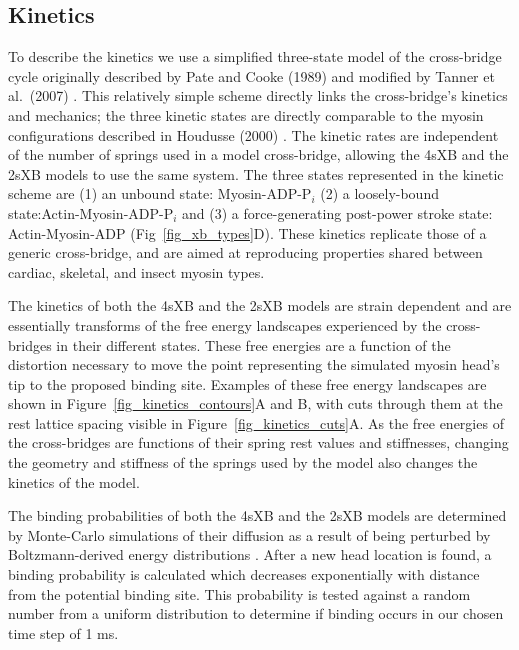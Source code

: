 \documentclass[10pt]{article}
\newcommand{\citep}[1]{\cite{#1}} %
\begin{document}
\subsection*{Kinetics} %

To describe the kinetics we use a simplified three-state model of the cross-bridge cycle originally described by Pate and Cooke (1989) \citep{Pate1989} and modified by Tanner et al.~(2007) \citep{Tanner2007}. 
This relatively simple scheme directly links the cross-bridge's kinetics and mechanics; the three kinetic states are directly comparable to the myosin configurations described in Houdusse (2000) \citep{Houdusse2000}. 
The kinetic rates are independent of the number of springs used in a model cross-bridge, allowing the 4sXB and the 2sXB models to use the same system. 
The three states represented in the kinetic scheme are (1) an unbound state: Myosin-ADP-P$_i$ (2) a loosely-bound state:Actin-Myosin-ADP-P$_i$ and (3) a force-generating post-power stroke state: Actin-Myosin-ADP (Fig~\ref{fig_xb_types}D). 
These kinetics replicate those of a generic cross-bridge, and are aimed at reproducing properties shared between cardiac, skeletal, and insect myosin types. 

The kinetics of both the 4sXB and the 2sXB models are strain dependent and are essentially transforms of the free energy landscapes experienced by the cross-bridges in their different states.
These free energies are a function of the distortion necessary to move the point representing the simulated myosin head's tip to the proposed binding site. 
Examples of these free energy landscapes are shown in Figure~\ref{fig_kinetics_contours}A and B, with cuts through them at the rest lattice spacing visible in Figure~\ref{fig_kinetics_cuts}A.
As the free energies of the cross-bridges are functions of their spring rest values and stiffnesses, changing the geometry and stiffness of the springs used by the model also changes the kinetics of the model. 

The binding probabilities of both the 4sXB and the 2sXB models are determined by Monte-Carlo simulations of their diffusion as a result of being perturbed by Boltzmann-derived energy distributions \citep{DillBook}. 
After a new head location is found, a binding probability is calculated which decreases exponentially with distance from the potential binding site. 
This probability is tested against a random number from a uniform distribution to determine if binding occurs in our chosen time step of 1 ms.
\end{document}
